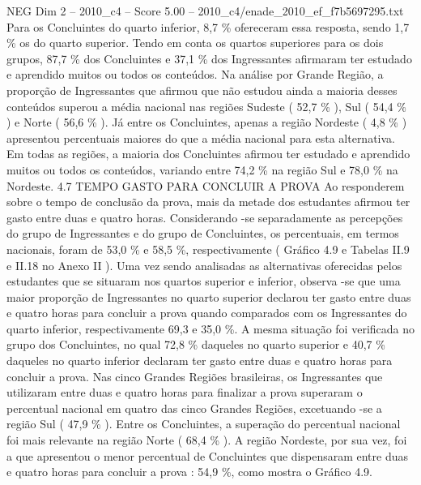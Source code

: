 \begin{textsample}{NEG Dim 2 – 2010\_c4 – Score 5.00 – 2010\_c4/enade\_2010\_ef\_f7b5697295.txt}
Para os Concluintes do quarto inferior, 8,7 \% ofereceram essa resposta, sendo 1,7 \% os do quarto superior.
Tendo em conta os quartos superiores para os dois grupos, 87,7 \% dos Concluintes e 37,1 \% dos Ingressantes afirmaram ter estudado e aprendido muitos ou todos os conteúdos.
Na análise por Grande Região, a proporção de Ingressantes que afirmou que não estudou ainda a maioria desses conteúdos superou a média nacional nas regiões Sudeste ( 52,7 \% ), Sul ( 54,4 \% ) e Norte ( 56,6 \% ).
Já entre os Concluintes, apenas a região Nordeste ( 4,8 \% ) apresentou percentuais maiores do que a média nacional para esta alternativa.
Em todas as regiões, a maioria dos Concluintes afirmou ter estudado e aprendido muitos ou todos os conteúdos, variando entre 74,2 \% na região Sul e 78,0 \% na Nordeste. 4.7 TEMPO GASTO PARA CONCLUIR A PROVA Ao responderem sobre o tempo de conclusão da prova, mais da metade dos estudantes afirmou ter gasto entre duas e quatro horas.
Considerando -se separadamente as percepções do grupo de Ingressantes e do grupo de Concluintes, os percentuais, em termos nacionais, foram de 53,0 \% e 58,5 \%, respectivamente ( Gráfico 4.9 e Tabelas II.9 e II.18 no Anexo II ).
Uma vez sendo analisadas as alternativas oferecidas pelos estudantes que se situaram nos quartos superior e inferior, observa -se que uma maior proporção de Ingressantes no quarto superior declarou ter gasto entre duas e quatro horas para concluir a prova quando comparados com os Ingressantes do quarto inferior, respectivamente 69,3 e 35,0 \%.
A mesma situação foi verificada no grupo dos Concluintes, no qual 72,8 \% daqueles no quarto superior e 40,7 \% daqueles no quarto inferior declaram ter gasto entre duas e quatro horas para concluir a prova.
Nas cinco Grandes Regiões brasileiras, os Ingressantes que utilizaram entre duas e quatro horas para finalizar a prova superaram o percentual nacional em quatro das cinco Grandes Regiões, excetuando -se a região Sul ( 47,9 \% ).
Entre os Concluintes, a superação do percentual nacional foi mais relevante na região Norte ( 68,4 \% ).
A região Nordeste, por sua vez, foi a que apresentou o menor percentual de Concluintes que dispensaram entre duas e quatro horas para concluir a prova : 54,9 \%, como mostra o Gráfico 4.9.

\end{textsample}
